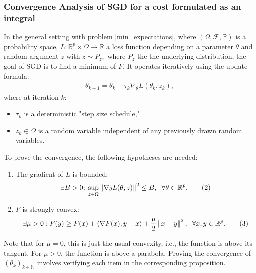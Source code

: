 \subsubsection{Convergence Analysis of SGD for a cost formulated as an integral}
In the general setting with problem \eqref{min_expectations}, where $(\Omega,\mathcal{F}, \mathbb{P})$ is a probability space, $L:\mathbb{R}^{p}\times\Omega\rightarrow \mathbb{R}$ a loss function depending on a parameter $\theta$ and random argument $z$ with $z\sim P_{z},$ where $P_{z}$ the the underlying distribution, the goal of SGD is to find a minimum of $F$. It operates iteratively using the update formula:
\begin{align}
\theta_{k+1} = \theta_{k} - \tau_{k}\nabla_{\theta}L(\theta_{k}, z_{k}), \tag{1}
\end{align}
where at iteration $k$:
\begin{itemize}
\item $\tau_k$ is a deterministic "step size schedule,"
\item $z_k \in \Omega$ is a random variable independent of any previously drawn random variables.
\end{itemize}
To prove the convergence, the following hypotheses are needed:
\begin{enumerate}
\item The gradient of $L$ is bounded:
\begin{align}
\exists B > 0\colon \underset{z\in \Omega}{\sup}\left\Vert\nabla_{\theta} L(\theta, z)\right\Vert^{2} \leq B, \hspace{0.2cm} \forall \theta \in \mathbb{R}^{p}. \tag{2}
\end{align}
\item $F$ is strongly convex:
\begin{align}
\exists\mu > 0: F(y) \geq F(x) + \langle\nabla F(x), y-x\rangle + \frac{\mu}{2}\left\Vert x-y\right\Vert^{2}, \hspace{0.2cm} \forall x, y \in \mathbb{R}^{p}. \tag{3}
\end{align}
\end{enumerate}
Note that for $\mu = 0$, this is just the usual convexity, i.e., the function is above its tangent. For $\mu > 0$, the function is above a parabola. Proving the convergence of $(\theta_{k})_{k\in \mathbb{N}}$ involves verifying each item in the corresponding proposition.
